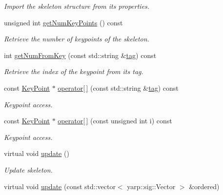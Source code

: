 \begin{DoxyCompactItemize}
\begin{DoxyCompactList}\small\item\em Import the skeleton structure from its properties. \end{DoxyCompactList}\item 
unsigned int \hyperlink{classassistive__rehab_1_1Skeleton_ac5e5b98f2c9178f6e0def5033e27922f}{get\+Num\+Key\+Points} () const
\begin{DoxyCompactList}\small\item\em Retrieve the number of keypoints of the skeleton. \end{DoxyCompactList}\item 
int \hyperlink{classassistive__rehab_1_1Skeleton_a954bfa99e0dad997ca6d93495246d3f1}{get\+Num\+From\+Key} (const std\+::string \&\hyperlink{classassistive__rehab_1_1Skeleton_a3d1ce5280300e012826948dc4383c2cb}{tag}) const
\begin{DoxyCompactList}\small\item\em Retrieve the index of the keypoint from its tag. \end{DoxyCompactList}\item 
const \hyperlink{classassistive__rehab_1_1KeyPoint}{Key\+Point} $\ast$ \hyperlink{classassistive__rehab_1_1Skeleton_a3ecc7418af653c88e40d41bb379b7271}{operator\mbox{[}$\,$\mbox{]}} (const std\+::string \&\hyperlink{classassistive__rehab_1_1Skeleton_a3d1ce5280300e012826948dc4383c2cb}{tag}) const
\begin{DoxyCompactList}\small\item\em Keypoint access. \end{DoxyCompactList}\item 
const \hyperlink{classassistive__rehab_1_1KeyPoint}{Key\+Point} $\ast$ \hyperlink{classassistive__rehab_1_1Skeleton_a0692ab89f16b0914b9ca9e0d4a07e52c}{operator\mbox{[}$\,$\mbox{]}} (const unsigned int i) const
\begin{DoxyCompactList}\small\item\em Keypoint access. \end{DoxyCompactList}\item 
\mbox{\label{classassistive__rehab_1_1Skeleton_a1ba2ba229331f7966ff1bce10c776d99}} 
virtual void \hyperlink{classassistive__rehab_1_1Skeleton_a1ba2ba229331f7966ff1bce10c776d99}{update} ()
\begin{DoxyCompactList}\small\item\em Update skeleton. \end{DoxyCompactList}\item 
virtual void \hyperlink{classassistive__rehab_1_1Skeleton_adbb387558eac21173b7c82cb43acd603}{update} (const std\+::vector$<$ yarp\+::sig\+::\+Vector $>$ \&ordered)

\end{DoxyCompactItemize}
